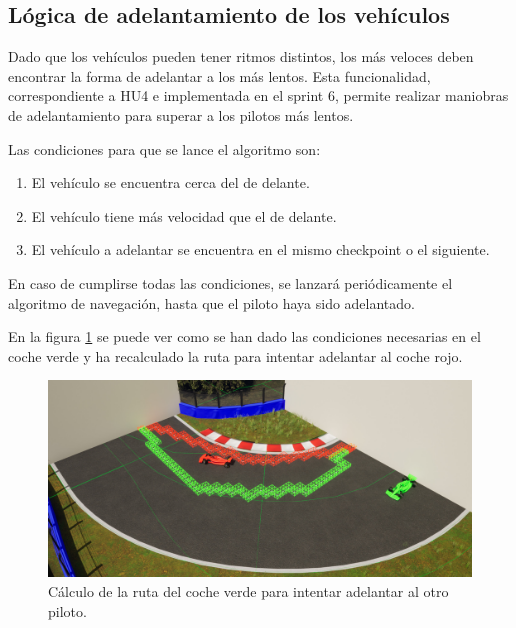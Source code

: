 \newpage

\subsection{Lógica de adelantamiento de los vehículos}

Dado que los vehículos pueden tener ritmos distintos, los más veloces deben encontrar la forma de adelantar a los más lentos. Esta funcionalidad, correspondiente a HU4 e implementada en el sprint 6, permite realizar maniobras de adelantamiento para superar a los pilotos más lentos.

\bigskip

Las condiciones para que se lance el algoritmo son:

\begin{enumerate}
    \item El vehículo se encuentra cerca del de delante.
    \item El vehículo tiene más velocidad que el de delante.
    \item El vehículo a adelantar se encuentra en el mismo checkpoint o el siguiente.
\end{enumerate}

En caso de cumplirse todas las condiciones, se lanzará periódicamente el algoritmo de navegación, hasta que el piloto haya sido adelantado.

\bigskip

En la figura \ref{fig:overtake} se puede ver como se han dado las condiciones necesarias en el coche verde y ha recalculado la ruta para intentar adelantar al coche rojo.

\begin{figure}[H]
    \centering
    \includegraphics[width=\textwidth]{imagenes/converted/overtake.jpg}
    \caption{Cálculo de la ruta del coche verde para intentar adelantar al otro piloto.}
    \label{fig:overtake}
\end{figure}

